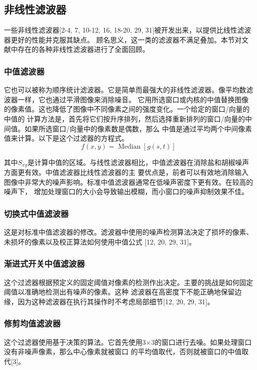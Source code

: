 \documentclass{article} %
\begin{document}
\subsection{非线性滤波器}
一些非线性滤波器[2-4, 7, 10-12, 16, 18-20, 29, 31]被开发出来，以提供比线性滤波器更好的性能并克服其缺点。
顾名思义，这一类的滤波器不满足叠加。本节对文献中存在的各种非线性滤波器进行了全面回顾。

\subsubsection{中值滤波器}
它也可以被称为顺序统计滤波器。它是简单而最强大的非线性滤波器。像平均数滤波器一样，它也通过平滑图像来消除噪音。
它用所选窗口或内核的中值替换图像的像素值。这也降低了图像中不同像素之间的强度变化。一个给定的窗口/向量的中值的
计算方法是，首先将它们按升序排列，然后选择重新排列的窗口/向量的中间值。如果所选窗口/向量中的像素数是偶数，那么
中值是通过平均两个中间像素值来计算。以下是这个过滤器的方程式。
\begin{equation}
    f(x, y)=\operatorname{Median}[g(s, t)]
\end{equation}

其中$S_{xy}$是计算中值的区域。与线性滤波器相比，中值滤波器在消除盐和胡椒噪声方面更有效。中值滤波器比线性滤波器的主
要优点是，前者可以有效地消除输入图像中非常大的噪声影响。标准中值滤波器通常在低噪声密度下更有效。在较高的噪声下，
增加处理窗口的大小会导致输出模糊，而小窗口的噪声抑制效果不佳。

\subsubsection{切换式中值滤波器}
这是对标准中值滤波器的修改。滤波器中使用的噪声检测算法决定了损坏的像素、未损坏的像素以及校正算法如何使用中值公式
[12, 20, 29, 31]。

\subsubsection{渐进式开关中值滤波器}
这个过滤器根据预定义的固定阈值对像素的检测作出决定。主要的挑战是如何固定阈值以准确地检测出有噪声的像素。这种
滤波器在高密度下不能正确地保留边缘，因为这种滤波器在执行其操作时不考虑局部细节[12, 20, 29, 31]。

\subsubsection{修剪均值滤波器}
这个过滤器使用基于决策的算法。它首先使用3×3的窗口进行去噪。如果处理窗口没有非噪声像素，那么中心像素就被窗口
的平均值取代，否则就被窗口的中值取代[3]。
\end{document}
